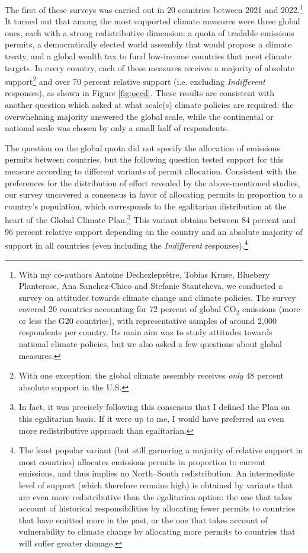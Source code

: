 \documentclass[a5paper,english,openany]{memoir}
\begin{document}
The first of these surveys was carried out in 20 countries %
between 2021 and 2022.\footnote{With my co-authors Antoine Dechezleprêtre, Tobias Kruse, Bluebery Planterose, Ana Sanchez-Chico and Stefanie Stantcheva, we conducted a survey on attitudes towards climate change and climate policies. The survey covered 20 countries accounting for 72 percent of global CO$_\text{2}$ emissions (more or less the G20 countries), with representative samples of around 2,000 respondents per country. Its main aim was to study attitudes towards national climate policies, but we also asked a few questions about global measures.} It turned out that among the most supported climate measures were three global ones, each with a strong redistributive dimension: a quota of tradable emissions permits, a democratically elected world assembly that would propose a climate treaty, and a global wealth tax to fund low-income countries that meet climate targets. In every country, each of these measures receives a majority of absolute support\footnote{With one exception: the global climate assembly receives \textit{only} 48 percent absolute support in the U.S.} 
and over 70 percent relative support (i.e. excluding \textit{Indifferent} responses), 
as shown in Figure \ref{fig:oecd}. These results are consistent with another question which asked at what scale(s) climate policies are required: %
the overwhelming majority answered the global scale, while the continental or national scale was chosen by only a small half of respondents. 

The question on the global quota did not specify the allocation of emissions permits between countries, but the following question tested support for this measure according to different variants of permit allocation. Consistent with the preferences for the distribution of effort revealed by the above-mentioned studies, our survey uncovered a consensus in favor  %
of allocating permits in proportion to a country's population, which corresponds to the egalitarian distribution at the heart of the Global Climate Plan.\footnote{In fact, it was precisely following this consensus that I defined the Plan on this egalitarian %
basis. If it were up to me, I would have preferred an even more redistributive approach than egalitarian.} This variant obtains between 84 percent and 96 percent relative support depending on the country %
and an absolute majority of support in all countries (even including the \textit{Indifferent} responses).\footnote{The least popular variant (but still garnering a majority of relative support in most countries) allocates emissions permits in proportion to current emissions, and thus implies no North--South redistribution. An intermediate level of support (which therefore remains high) is obtained by variants that are even more redistributive than the egalitarian option: the one that takes account of historical responsibilities by allocating fewer permits to countries that have emitted more in the past, or the one that takes account of vulnerability to climate change by allocating more permits to countries that will suffer greater damage.}
\end{document}
